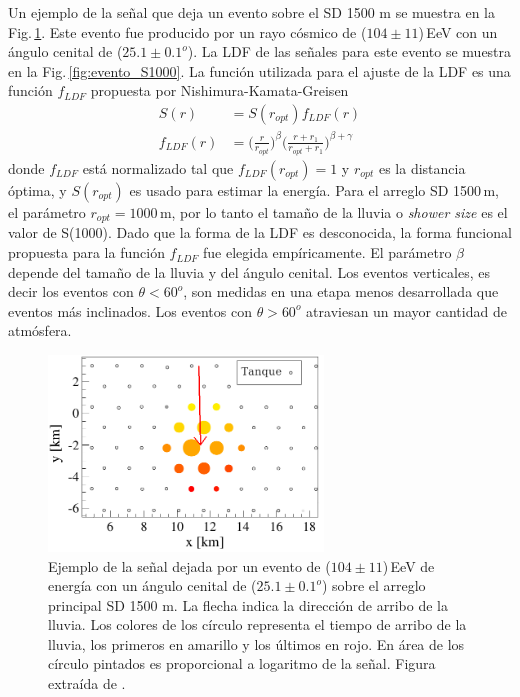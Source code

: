 Un ejemplo de la señal que deja un evento sobre el SD 1500 m se muestra en la Fig.\,\ref{fig:evento_sd}. Este evento fue producido por un rayo cósmico de ($104\pm11$)\,EeV con un ángulo cenital de ($25.1\pm0.1 ^o$). La LDF de las señales para este evento se muestra en la Fig.\,\ref{fig:evento_S1000}. La función utilizada para el ajuste de la LDF es una función  $f_{LDF}$ propuesta por Nishimura-Kamata-Greisen \cite{data}
\begin{align*}
	S(r) &= S(r_{opt})f_{LDF}(r)\\
	f_{LDF}(r)&=\bigg(\frac{r}{r_{opt}}\bigg)^{\beta}\bigg(\frac{r+r_1}{r_{opt}+r_1}\bigg)^{\beta + \gamma}
\end{align*}
donde $f_{LDF}$ está normalizado tal que $f_{LDF}(r_{opt})=1$ y $r_{opt}$ es la distancia óptima, %
y $S(r_{opt})$ es usado para estimar la energía. Para el arreglo SD 1500\,m, el parámetro $r_{opt}=1000\,$m, por lo tanto el tamaño de la lluvia o \emph{shower size} es el valor de S(1000). Dado que la forma de la LDF es desconocida, la forma funcional propuesta para la función $f_{LDF}$ fue elegida empíricamente.  El parámetro $\beta$ depende del tamaño de la lluvia y del ángulo cenital. Los eventos verticales, es decir los eventos con $\theta < 60^o$, son medidas en una etapa menos desarrollada que eventos más inclinados. Los eventos con $\theta>60^o$ atraviesan un mayor cantidad de atmósfera.


\begin{figure}[H]
	\begin{small}
		\begin{center}
			\includegraphics[width=0.65\textwidth]{evento_sd.png}
		\end{center}
		\caption{Ejemplo de la señal dejada por un evento de ($104\pm11$)\,EeV de energía con un ángulo cenital de ($25.1\pm0.1 ^o$) sobre el arreglo principal SD 1500 m. La flecha indica la dirección de arribo de la lluvia. Los colores de los círculo representa el tiempo de arribo de la lluvia, los primeros en amarillo y los últimos en rojo. En área de los círculo pintados es proporcional a logaritmo de la señal. Figura extraída de \cite{como_funciona_auger}. } 	\label{fig:evento_sd}
	\end{small}
\end{figure}


